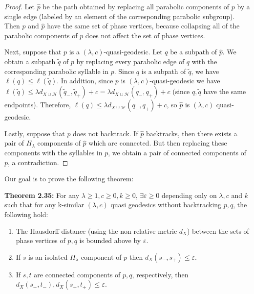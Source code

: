 \documentclass[12pt]{article}
\newcommand{\vs}{\vskip10pt}
\begin{document}
	\begin{proof}
		
		Let $\hat{p}$ be the path obtained by replacing all parabolic components of $p$ by a single edge (labeled by an element of the corresponding parabolic subgroup). Then $p$ and $\hat{p}$ have the same set of phase vertices, because collapsing all of the parabolic components of $p$ does not affect the set of phase vertices. 
		
		\vs 
		
		Next, suppose that $p$ is a $(\lambda, c)$-quasi-geodesic. Let $q$ be a subpath of $\hat{p}$. We obtain a subpath $\tilde{q}$ of $p$ by replacing every parabolic edge of $q$ with the corresponding parabolic syllable in $p$. Since $q$ is a subpath of $\tilde{q}$, we have $\ell(q) \leq \ell(\tilde{q})$. In addition, since $p$ is $(\lambda,c)$-quasi-geodesic we have $\ell(\tilde{q}) \leq \lambda d_{X \cup \mathcal{H}}(\tilde{q}_{-}, \tilde{q}_{+}) + c = \lambda d_{X \cup \mathcal{H}}(q_{-}, q_{+}) + c$ (since $q, \tilde{q}$ have the same endpoints). Therefore, $\ell(q) \leq \lambda d_{X \cup \mathcal{H}}(q_{-}, q_{+}) + c$, so $\hat{p}$ is $(\lambda, c)$ quasi-geodesic.
		
		\vs 
		
		Lastly, suppose that $p$ does not backtrack. If $\hat{p}$ backtracks, then there exists a pair of $H_{\lambda}$ components of $\hat{p}$ which are connected. But then replacing these components with the syllables in $p$, we obtain a pair of connected components of $p$, a contradiction. 
		
	\end{proof}

	Our goal is to prove the following theorem: 
	
	\vs 
	
	\textbf{Theorem 2.35: } For any $\lambda \geq 1, c \geq 0, k \geq 0$, $\exists \varepsilon \geq 0$ depending only on $\lambda, c$ and $k$ such that for any k-similar $(\lambda, c)$ quasi geodesics without backtracking $p,q$, the following hold: 
	
	\begin{enumerate}[label = (\alph*)]
		\item The Hausdorff distance (using the non-relative metric $d_X$) between the sets of phase vertices of $p,q$ is bounded above by $\varepsilon$. 
		\item If $s$ is an isolated $H_{\lambda}$ component of $p$ then $d_X(s_{-}, s_{+}) \leq \varepsilon$. 
		\item If $s,t$ are connected components of $p,q$, respectively, then $d_X(s_{-}, t_{-}), d_X(s_{+}, t_{+}) \leq \varepsilon$. 
	\end{enumerate} 
\end{document}
